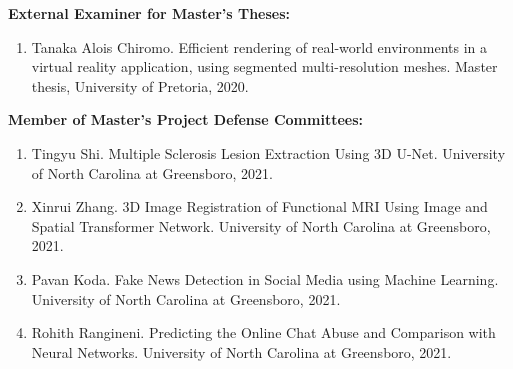 \documentclass[wideaddress]{vitae}
\let\olditem\item
\def\item{\nopagebreak[4]\olditem}%
\newcommand{\resitem}[1]{
	\item \begin{flushleft} #1 \end{flushleft}
}
\newenvironment{resnumberedlist}[1]{
	\resitem{\textbf{#1}}
	\begin{enumerate}
}{
	\end{enumerate}
}
\begin{document}
\begin{description}
	\begin{resnumberedlist}{External Examiner for Master's Theses:}
	\resitem{Tanaka Alois Chiromo. Efficient rendering of real-world environments in a virtual reality application, using segmented multi-resolution meshes. Master thesis, University of Pretoria, 2020.}
	\end{resnumberedlist}

    \begin{resnumberedlist}{Member of Master's Project Defense Committees:}
	\resitem{Tingyu Shi. Multiple Sclerosis Lesion Extraction Using 3D U-Net. University of North Carolina at Greensboro, 2021.}
	\resitem{Xinrui Zhang. 3D Image Registration of Functional MRI Using Image and Spatial Transformer Network. University of North Carolina at Greensboro, 2021.}
	\resitem{Pavan Koda. Fake News Detection in Social Media using Machine Learning. University of North Carolina at Greensboro, 2021.}
	\resitem{Rohith Rangineni. Predicting the Online Chat Abuse and Comparison with Neural Networks. University of North Carolina at Greensboro, 2021.}

    \end{resnumberedlist}
    

\end{description}
\end{document}
